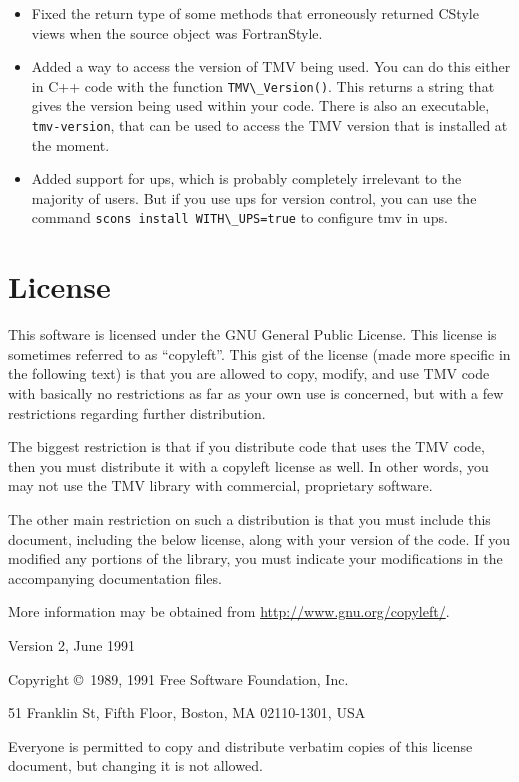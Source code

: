 \documentclass[twoside,letterpaper,11pt]{article}
\renewcommand{\tt}[1]{{\lstinline {#1}}}
\begin{document}
\begin{description}
\begin{itemize}
\item
Fixed the return type of some methods that erroneously returned CStyle
views when the source object was FortranStyle.

\item
Added a way to access the version of TMV being used.
You can do this either in C++ code with the function \tt{TMV\_Version()}.
This returns a string that gives the version being used within your code.
There is also an executable, \tt{tmv-version}, that can be used to access
the TMV version that is installed at the moment.

\item
Added support for ups, which is probably completely irrelevant
to the majority of users.  But if you use ups for version control, you can
use the command \tt{scons install WITH\_UPS=true} to configure tmv in ups.

\end{itemize}

\end{description}

\newpage
\section{License}
\label{license}

This software is licensed under the GNU General Public License.  This license is
sometimes referred to as ``copyleft''.  This gist of the license (made more specific
in the following text) is that you are allowed to copy, modify, and use TMV code
with basically no restrictions as far as your own use is concerned, 
but with a few restrictions regarding further distribution.

The biggest restriction is that if you distribute code that
uses the TMV code, then you must distribute it with a copyleft license as well.
In other words, you may not use the TMV library with commercial, proprietary 
software. 

The other main restriction on such a distribution is that you must include this 
document,
including the below license, along with your version of the code.  If you modified
any portions of the library, you must indicate your modifications in the accompanying
documentation files.

More information may be obtained from \url{http://www.gnu.org/copyleft/}.

\begin{center}
{\parindent 0in

Version 2, June 1991

Copyright \copyright\ 1989, 1991 Free Software Foundation, Inc.

\bigskip

51 Franklin St, Fifth Floor, Boston, MA  02110-1301, USA

\bigskip

Everyone is permitted to copy and distribute verbatim copies
of this license document, but changing it is not allowed.
}
\end{center}
\end{document}
